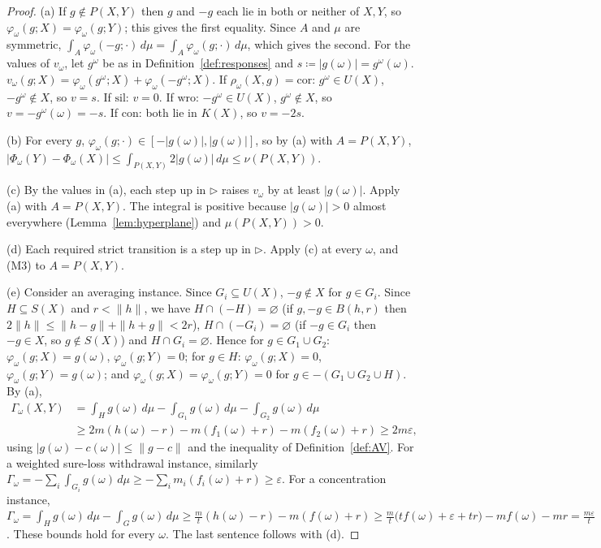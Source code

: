 \documentclass[11pt]{article}
\theoremstyle{definition}
\newcommand{\cor}{\mathrm{cor}}
\newcommand{\sil}{\mathrm{sil}}
\newcommand{\wro}{\mathrm{wro}}
\newcommand{\con}{\mathrm{con}}
\begin{document}
\begin{proof}
(a) If $g\notin P(X,Y)$ then $g$ and $-g$ each lie in both or neither of $X,Y$, so $\varphi_\omega(g;X)=\varphi_\omega(g;Y)$; this gives the first equality. Since $A$ and $\mu$ are symmetric, $\int_A\varphi_\omega(-g;\cdot)\,d\mu=\int_A\varphi_\omega(g;\cdot)\,d\mu$, which gives the second. For the values of $v_\omega$, let $g^\omega$ be as in Definition~\ref{def:responses} and $s\coloneqq|g(\omega)|=g^\omega(\omega)$. $v_\omega(g;X)=\varphi_\omega(g^\omega;X)+\varphi_\omega(-g^\omega;X)$. If $\rho_\omega(X,g)=\cor$: $g^\omega\in U(X)$, $-g^\omega\notin X$, so $v=s$. If $\sil$: $v=0$. If $\wro$: $-g^\omega\in U(X)$, $g^\omega\notin X$, so $v=-g^\omega(\omega)=-s$. If $\con$: both lie in $K(X)$, so $v=-2s$.

(b) For every $g$, $\varphi_\omega(g;\cdot)\in[-|g(\omega)|,|g(\omega)|]$, so by (a) with $A=P(X,Y)$, $|\Phi_\omega(Y)-\Phi_\omega(X)|\le\int_{P(X,Y)}2|g(\omega)|\,d\mu\le\nu(P(X,Y))$.

(c) By the values in (a), each step up in $\rhd$ raises $v_\omega$ by at least $|g(\omega)|$. Apply (a) with $A=P(X,Y)$. The integral is positive because $|g(\omega)|>0$ almost everywhere (Lemma~\ref{lem:hyperplane}) and $\mu(P(X,Y))>0$.

(d) Each required strict transition is a step up in $\rhd$. Apply (c) at every $\omega$, and (M3) to $A=P(X,Y)$.

(e) Consider an averaging instance. Since $G_i\subseteq U(X)$, $-g\notin X$ for $g\in G_i$. Since $H\subseteq S(X)$ and $r<\|h\|$, we have $H\cap(-H)=\varnothing$ (if $g,-g\in B(h,r)$ then $2\|h\|\le\|h-g\|+\|h+g\|<2r$), $H\cap(-G_i)=\varnothing$ (if $-g\in G_i$ then $-g\in X$, so $g\notin S(X)$) and $H\cap G_i=\varnothing$. Hence for $g\in G_1\cup G_2$: $\varphi_\omega(g;X)=g(\omega)$, $\varphi_\omega(g;Y)=0$; for $g\in H$: $\varphi_\omega(g;X)=0$, $\varphi_\omega(g;Y)=g(\omega)$; and $\varphi_\omega(g;X)=\varphi_\omega(g;Y)=0$ for $g\in-(G_1\cup G_2\cup H)$. By (a),
\begin{align*}
\Gamma_\omega(X,Y)&=\int_Hg(\omega)\,d\mu-\int_{G_1}g(\omega)\,d\mu-\int_{G_2}g(\omega)\,d\mu\\
&\ge2m(h(\omega)-r)-m(f_1(\omega)+r)-m(f_2(\omega)+r)\ge2m\varepsilon,
\end{align*}
using $|g(\omega)-c(\omega)|\le\|g-c\|$ and the inequality of Definition~\ref{def:AV}. For a weighted sure-loss withdrawal instance, similarly $\Gamma_\omega=-\sum_i\int_{G_i}g(\omega)\,d\mu\ge-\sum_im_i(f_i(\omega)+r)\ge\varepsilon$. For a concentration instance, $\Gamma_\omega=\int_Hg(\omega)\,d\mu-\int_Gg(\omega)\,d\mu\ge\frac mt(h(\omega)-r)-m(f(\omega)+r)\ge\frac mt\bigl(tf(\omega)+\varepsilon+tr\bigr)-mf(\omega)-mr=\frac{m\varepsilon}t$. These bounds hold for every $\omega$. The last sentence follows with (d).
\end{proof}
\end{document}
